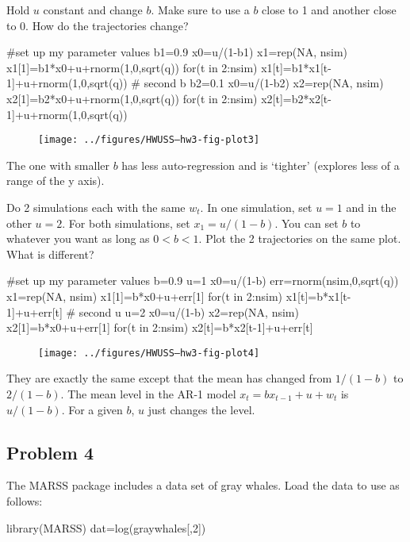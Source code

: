 \begin{wideitemize}
\item Hold $u$ constant and change $b$.  Make sure to use a $b$ close to 1 and another close to 0. How do the trajectories change?
\begin{Schunk}
\begin{Sinput}
 #set up my parameter values
 b1=0.9
 x0=u/(1-b1)
 x1=rep(NA, nsim)
 x1[1]=b1*x0+u+rnorm(1,0,sqrt(q))
 for(t in 2:nsim) x1[t]=b1*x1[t-1]+u+rnorm(1,0,sqrt(q))
 # second b
 b2=0.1
 x0=u/(1-b2)
 x2=rep(NA, nsim)
 x2[1]=b2*x0+u+rnorm(1,0,sqrt(q))
 for(t in 2:nsim) x2[t]=b2*x2[t-1]+u+rnorm(1,0,sqrt(q))
\end{Sinput}
\end{Schunk}
\begin{figure}[htp]
\begin{center}
\texttt{[image: ../figures/HWUSS--hw3-fig-plot3]}
\end{center}
\end{figure}
The one with smaller $b$ has less auto-regression and is `tighter' (explores less of a range of the y axis).

\item Do 2 simulations each with the same $w_t$.  In one simulation, set $u=1$ and in the other $u=2$.  For both simulations, set $x_1 = u/(1-b)$.  You can set $b$ to whatever you want as long as $0<b<1$.  Plot the 2 trajectories on the same plot.  What is different?

\begin{Schunk}
\begin{Sinput}
 #set up my parameter values
 b=0.9
 u=1
 x0=u/(1-b)
 err=rnorm(nsim,0,sqrt(q))
 x1=rep(NA, nsim)
 x1[1]=b*x0+u+err[1]
 for(t in 2:nsim) x1[t]=b*x1[t-1]+u+err[t]
 # second u
 u=2
 x0=u/(1-b)
 x2=rep(NA, nsim)
 x2[1]=b*x0+u+err[1]
 for(t in 2:nsim) x2[t]=b*x2[t-1]+u+err[t]
\end{Sinput}
\end{Schunk}
\begin{figure}[htp]
\begin{center}
\texttt{[image: ../figures/HWUSS--hw3-fig-plot4]}
\end{center}
\end{figure}
They are exactly the same except that the mean has changed from $1/(1-b)$ to $2/(1-b)$.  The mean level in the AR-1 model $x_t = b x_{t-1} + u + w_t$ is $u/(1-b)$.  For a given $b$, $u$ just changes the level.
\end{wideitemize}


\subsection*{Problem 4}
The MARSS package includes a data set of gray whales.  Load the data to use as follows:
\begin{Schunk}
\begin{Sinput}
 library(MARSS)
 dat=log(graywhales[,2])
\end{Sinput}
\end{Schunk}

